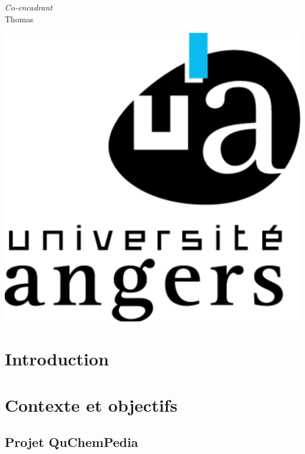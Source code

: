 \documentclass{report}
\begin{document}
\begin{titlepage}
\begin{center}
	\vspace{0.5cm}
	\emph{Co-encadrant}\\
	Thomas \\

	\end{center}		
	
	\vspace{3.09cm}
	
	\hspace{14.4cm} \includegraphics[scale = 0.07]{images/ua.png}



    
    
\end{titlepage}



\tableofcontents

\chapter*{Introduction}
	

\chapter{Contexte et objectifs}
	\section{Projet QuChemPedia}
		
\end{document}
